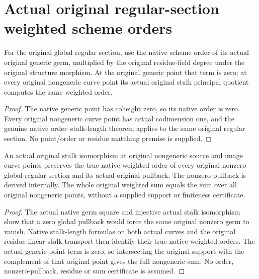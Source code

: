 \section{Actual original regular-section weighted scheme orders}

\begin{definition}
\label{def:fc-native-weighted-regular-section-order}
\leanok
{}
For the original global regular section, use the native scheme order of
its actual original generic germ, multiplied by the original residue-field
degree under the original structure morphism.  At the original generic
point that term is zero; at every original nongeneric curve point its
actual original stalk principal quotient computes the same weighted order.
\end{definition}
\begin{proof}
The native generic point has coheight zero, so its native order is zero.
Every original nongeneric curve point has actual codimension one, and the
genuine native order--stalk-length theorem applies to the same original
regular section.  No point/order or residue matching premise is supplied.
\end{proof}

\begin{theorem}
\label{thm:fc-native-weighted-regular-section-transport}
\leanok
{}
An actual original stalk isomorphism at original nongeneric source and
image curve points preserves the true native weighted order of every
original nonzero global regular section and its actual original pullback.
The nonzero pullback is derived internally.  The whole original weighted
sum equals the sum over all original nongeneric points, without a supplied
support or finiteness certificate.
\end{theorem}
\begin{proof}
The actual native germ square and injective actual stalk isomorphism show
that a zero global pullback would force the same original nonzero germ to
vanish.  Native stalk-length formulas on both actual curves and the
original residue-linear stalk transport then identify their true native
weighted orders.  The actual generic-point term is zero, so intersecting
the original support with the complement of that original point gives the
full nongeneric sum.  No order, nonzero-pullback, residue or sum certificate
is assumed.
\end{proof}
